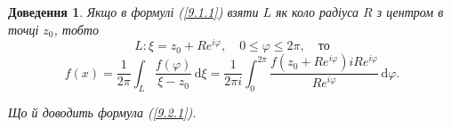 \documentclass[12pt,fleqn]{article}
\theoremstyle{theorem}
\theoremstyle{proof}
\newtheorem*{dov}{Доведення}
\numberwithin{figure}{section}
\numberwithin{equation}{section}
\begin{document}
\begin{dov}
Якщо в формулі (\ref{9.1.1}) взяти $L$ як коло радіуса $R$ з центром в точці $z_0$, тобто
\[ L: \xi=z_0+Re^{i\varphi},\quad 0\leq\varphi\leq2\pi,\quad \text{то} \]
\[ f(x)=\frac{1}{2\pi}\int_{L}\frac{f(\varphi)}{\xi-z_0}\,\mathrm{d}\xi = \frac{1}{2\pi i} \int_{0}^{2\pi}\frac{f(z_0+Re^{i\varphi})iRe^{i\varphi}}{Re^{i\varphi}}\,\mathrm{d}\varphi. \]

Що й доводить формула (\ref{9.2.1}).
\end{dov}
\end{document}
